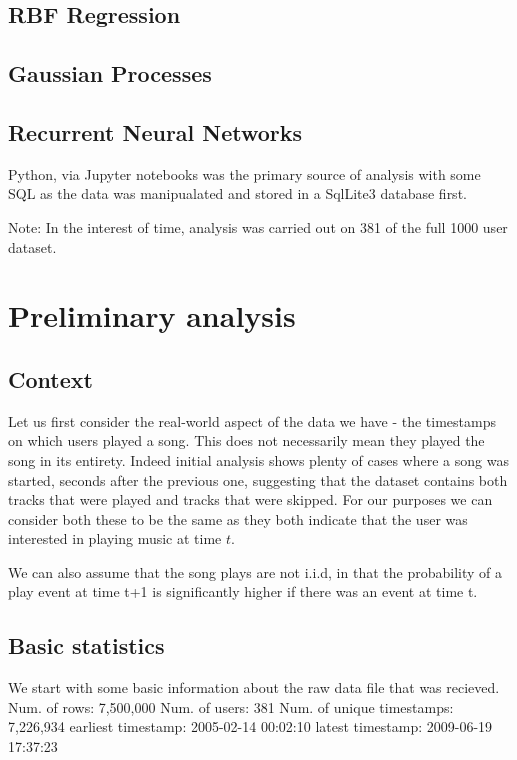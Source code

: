 \subsection{RBF Regression}


\subsection{Gaussian Processes}

\subsection{Recurrent Neural Networks}

Python, via Jupyter notebooks was the primary source of analysis with some SQL as the data was manipualated and stored in a SqlLite3 database first.

Note: In the interest of time, analysis was carried out on 381 of the full 1000 user dataset.

\section{Preliminary analysis}

\subsection{Context}

Let us first consider the real-world aspect of the data we have - the timestamps on which users played a song. This does not necessarily mean they played the song in its entirety. Indeed initial analysis shows plenty of cases where a song was started, seconds after the previous one, suggesting that the dataset contains both tracks that were played and tracks that were skipped. For our purposes we can consider both these to be the same as they both indicate that the user was interested in playing music at time $t$.

We can also assume that the song plays are not i.i.d, in that the probability of a play event at time t+1 is significantly higher if there was an event at time t. 

\subsection{Basic statistics} 

We start with some basic information about the raw data file that was recieved. 
Num. of rows: 7,500,000
Num. of users: 381
Num. of unique timestamps: 7,226,934
earliest timestamp: 2005-02-14 00:02:10
latest timestamp: 2009-06-19 17:37:23

